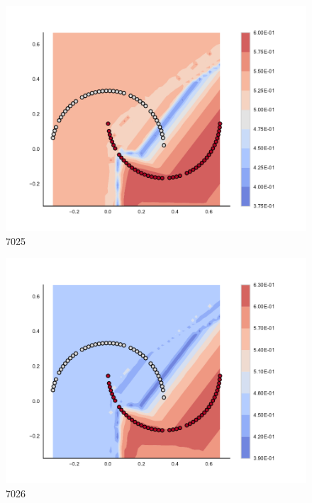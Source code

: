 \begin{subfigure}[b]{0.09\textwidth}
    \includegraphics[clip, trim=2.35cm 1.75cm 4.5cm 0cm,width=\textwidth]{img/convergence/7025.pdf}
    \caption{7025}
    \label{fig:convergence_7025}
\end{subfigure}
%
\begin{subfigure}[b]{0.09\textwidth}
    \includegraphics[clip, trim=2.35cm 1.75cm 4.5cm 0cm,width=\textwidth]{img/convergence/7026.pdf}
    \caption{7026}
    \label{fig:convergence_7026}
\end{subfigure}
%
